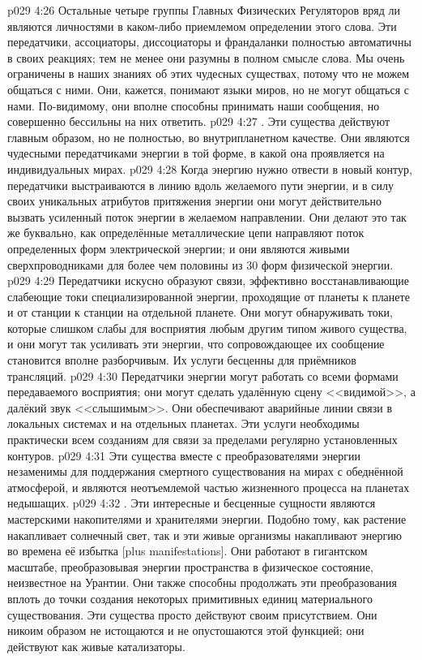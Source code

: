 \vs p029 4:26 \pc Остальные четыре группы Главных Физических Регуляторов вряд ли являются личностями в каком\hyp{}либо приемлемом определении этого слова. Эти передатчики, ассоциаторы, диссоциаторы и франдаланки полностью автоматичны в своих реакциях; тем не менее они разумны в полном смысле слова. Мы очень ограничены в наших знаниях об этих чудесных существах, потому что не можем общаться с ними. Они, кажется, понимают языки миров, но не могут общаться с нами. По\hyp{}видимому, они вполне способны принимать наши сообщения, но совершенно бессильны на них ответить.
\vs p029 4:27 . Эти существа действуют главным образом, но не полностью, во внутрипланетном качестве. Они являются чудесными передатчиками энергии в той форме, в какой она проявляется на индивидуальных мирах.
\vs p029 4:28 Когда энергию нужно отвести в новый контур, передатчики выстраиваются в линию вдоль желаемого пути энергии, и в силу своих уникальных атрибутов притяжения энергии они могут действительно вызвать усиленный поток энергии в желаемом направлении. Они делают это так же буквально, как определённые металлические цепи направляют поток определенных форм электрической энергии; и они являются живыми сверхпроводниками для более чем половины из 30 форм физической энергии.
\vs p029 4:29 Передатчики искусно образуют связи, эффективно восстанавливающие слабеющие токи специализированной энергии, проходящие от планеты к планете и от станции к станции на отдельной планете. Они могут обнаруживать токи, которые слишком слабы для восприятия любым другим типом живого существа, и они могут так усиливать эти энергии, что сопровождающее их сообщение становится вполне разборчивым. Их услуги бесценны для приёмников трансляций.
\vs p029 4:30 Передатчики энергии могут работать со всеми формами передаваемого восприятия; они могут сделать удалённую сцену <<видимой>>, а далёкий звук <<слышимым>>. Они обеспечивают аварийные линии связи в локальных системах и на отдельных планетах. Эти услуги необходимы практически всем созданиям для связи за пределами регулярно установленных контуров.
\vs p029 4:31 Эти существа вместе с преобразователями энергии незаменимы для поддержания смертного существования на мирах с обеднённой атмосферой, и являются неотъемлемой частью жизненного процесса на планетах недышащих.
\vs p029 4:32 . Эти интересные и бесценные сущности являются мастерскими накопителями и хранителями энергии. Подобно тому, как растение накапливает солнечный свет, так и эти живые организмы накапливают энергию во времена её избытка [plus manifestations]. Они работают в гигантском масштабе, преобразовывая энергии пространства в физическое состояние, неизвестное на Урантии. Они также способны продолжать эти преобразования вплоть до точки создания некоторых примитивных единиц материального существования. Эти существа просто действуют своим присутствием. Они никоим образом не истощаются и не опустошаются этой функцией; они действуют как живые катализаторы.
